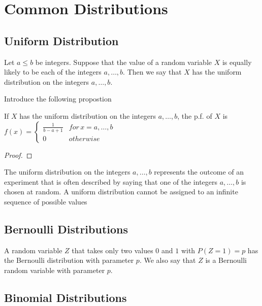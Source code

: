 %
%

\section{Common Distributions}
\label{sec:probability_distributions}


\subsection{Uniform Distribution}

\begin{definition}
Let $a \leq b$ be integers. Suppose that the value of a random variable $X$ is equally likely to be each of the integers $a, \ldots, b$. Then we say that $X$ has the uniform distribution on the integers $a, \ldots, b$.
\end{definition}

{\color{red} Introduce the following propostion}

\begin{proposition}
If $X$ has the uniform distribution on the integers $a,\ldots,b$, the p.f. of $X$ is $f\left(x\right)=\begin{cases}
\frac{1}{b-a+1} & for\,x=a,\ldots,b\\
0 & otherwise
\end{cases}$
\end{proposition}
\begin{proof}
\end{proof}

{\color{red} The uniform distribution on the integers $a, \ldots, b$ represents the outcome of an experiment that is often described by saying that one of the integers $a, \ldots, b$ is chosen at random. A uniform distribution cannot be assigned to an infinite sequence of possible values}


\subsection{Bernoulli Distributions}

\begin{example}
A random variable $Z$ that takes only two values $0$ and $1$ with $P\left(Z=1\right)=p$ has the Bernoulli distribution with parameter $p$. We also say that $Z$ is a Bernoulli random variable with parameter $p$.
\end{example}

\subsection{Binomial Distributions}

